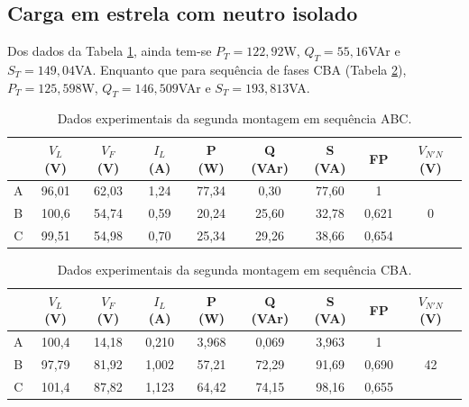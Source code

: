 \documentclass[a4paper,12pt,oneside,openany,table,xcdraw]{article}
\begin{document}
\subsection{Carga em estrela com neutro isolado} \label{m2:dados}
Dos dados da Tabela \ref{m2:dados:abc}, ainda tem-se $P_T = 122,92$W, $Q_T = 55,16$VAr e $S_T = 149,04$VA. Enquanto que para sequência de fases CBA (Tabela \ref{m2:dados:cba}), $P_T = 125,598$W, $Q_T = 146,509$VAr e $S_T = 193,813$VA.

\begin{table}[H]
\centering \small {}
\caption{Dados experimentais da segunda montagem em sequência ABC.}
\label{m2:dados:abc}
\begin{tabular}{c|c|c|c|c|c|c|c|c|}
\cline{2-9}
                        & $V_L$ (V) & $V_F$ (V) & $I_L$ (A) & P (W) & Q (VAr) & S (VA) & FP    & $V_{N'N}$ (V)      \\ \hline
\multicolumn{1}{|c|}{A} & 96,01     & 62,03     & 1,24      & 77,34 & 0,30    & 77,60  & 1     & \multirow{3}{*}{0} \\ \cline{1-8}
\multicolumn{1}{|c|}{B} & 100,6     & 54,74     & 0,59      & 20,24 & 25,60   & 32,78  & 0,621 &                    \\ \cline{1-8}
\multicolumn{1}{|c|}{C} & 99,51     & 54,98     & 0,70      & 25,34 & 29,26   & 38,66  & 0,654 &                    \\ \hline
\end{tabular}
\end{table}

\begin{table}[H]
\caption{Dados experimentais da segunda montagem em sequência CBA.}
\label{m2:dados:cba}
\centering \small {}
\begin{tabular}{c|c|c|c|c|c|c|c|c|}
\cline{2-9}
                        & $V_L$ (V) & $V_F$ (V) & $I_L$ (A) & P (W) & Q (VAr) & S (VA) & FP    & $V_{N'N}$ (V)      \\ \hline
\multicolumn{1}{|c|}{A} & 100,4     & 14,18     & 0,210     & 3,968 & 0,069   & 3,963  & 1     & \multirow{3}{*}{42} \\ \cline{1-8}
\multicolumn{1}{|c|}{B} & 97,79     & 81,92     & 1,002     & 57,21 & 72,29   & 91,69  & 0,690 &                     \\ \cline{1-8}
\multicolumn{1}{|c|}{C} & 101,4     & 87,82     & 1,123     & 64,42 & 74,15   & 98,16  & 0,655 &                     \\ \hline
\end{tabular}
\end{table}
\end{document}
